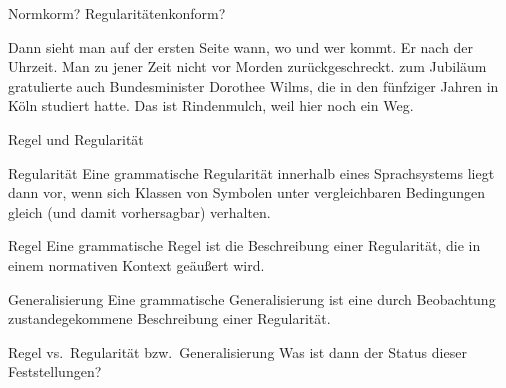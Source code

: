 \begin{frame}
  {Normkorm? Regularitätenkonform?}
  \pause
  \begin{exe}
    \ex
    \begin{xlist}
      \ex Dann sieht man auf der ersten Seite \alert{wann, wo und wer}  kommt.
      \pause
      \ex Er  nach der Uhrzeit.
      \pause
      \ex Man  zu jener Zeit nicht vor Morden \alert{zurückgeschreckt}.
      \pause
      \ex {} \alert{zum Jubiläum} gratulierte auch Bundesminister Dorothee Wilms, die in den fünfziger Jahren in Köln studiert hatte.
      \pause
      \ex Das ist Rindenmulch, \alert{weil} hier  noch ein Weg.
    \end{xlist}
  \end{exe}
\end{frame}


\begin{frame}
  {Regel und Regularität}
  \pause
  \begin{block}{Regularität}
    Eine grammatische Regularität innerhalb eines Sprachsystems liegt dann vor, wenn sich Klassen von Symbolen unter vergleichbaren Bedingungen gleich (und damit vorhersagbar) verhalten.
  \end{block}

  \pause
  \vspace{0.5\baselineskip}

  \begin{block}{Regel}
    Eine grammatische Regel ist die Beschreibung einer Regularität, die in einem normativen Kontext geäußert wird.
  \end{block}

  \pause
  \vspace{0.5\baselineskip}
  
  \begin{block}{Generalisierung}
    Eine grammatische Generalisierung ist eine durch Beobachtung zustandegekommene Beschreibung einer Regularität.
  \end{block}
\end{frame}

\begin{frame}
  {Regel vs.\ Regularität bzw.\ Generalisierung}
  Was ist dann der Status dieser Feststellungen?\\
  \Zeile
  \begin{exe}
    \ex
    \begin{xlist}
    \end{xlist}
  \end{exe}
\end{frame}




